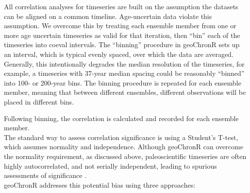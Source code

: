 \documentclass[gchron, manuscript]{copernicus}
\begin{document}
All correlation analyses for timeseries are built on the assumption the
datasets can be aligned on a common timeline. Age-uncertain data violate
this assumption. We overcome this by treating each ensemble member from
one or more age uncertain timeseries as valid for that iteration, then
``bin'' each of the timeseries into coeval intervals. The ``binning''
procedure in geoChronR sets up an interval, which is typical evenly
spaced, over which the data are averaged. Generally, this intentionally
degrades the median resolution of the timeseries, for example, a
timeseries with 37-year median spacing could be reasonably ``binned''
into 100- or 200-year bins. The binning procedure is repeated for each
ensemble member, meaning that between different ensembles, different
observations will be placed in different bins.

Following binning, the correlation is calculated and recorded for each
ensemble member.\\
The standard way to assess correlation significance is using a Student's
T-test, which assumes normality and independence. Although geoChronR can
overcome the normality requirement, as discussed above, paleoscientific
timeseries are often highly autocorrelated, and not serially
independent, leading to spurious assessments of significance
\citep{Hu_epsl17}.\\
geoChronR addresses this potential bias using three approaches:
\end{document}
